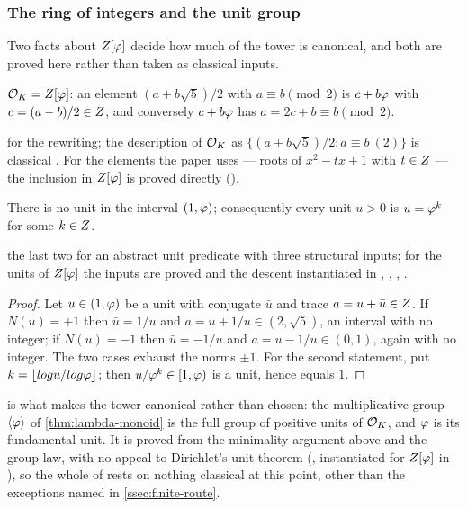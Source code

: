 \subsubsection{The ring of integers and the unit group}\label{ssec:units}

Two facts about $Z[\varphi]$ decide how much of the tower is canonical, and both are proved here
rather than taken as classical inputs.

\begin{proposition}\label{prop:OK}
$\mathcal{O}_K=Z[\varphi]$: an element $(a+b\sqrt5)/2$ with $a\equiv b\pmod2$ is
$c+b\varphi$ with $c=(a-b)/2\in Z$, and conversely $c+b\varphi$ has
$a=2c+b\equiv b\pmod2$.
\end{proposition}
for the
rewriting; the description of $\mathcal{O}_K$ as $\{(a+b\sqrt5)/2 : a\equiv b\ (2)\}$ is classical
.  For the elements the paper uses --- roots of $x^2-tx+1$ with $t\in Z$ --- the
inclusion in $Z[\varphi]$ is proved directly ().

\begin{theorem}\label{thm:units}
There is no unit in the interval $(1,\varphi)$; consequently every unit $u>0$ is
$u=\varphi^{k}$ for some $k\in Z$.
\end{theorem}
the last two for an abstract unit
predicate with three structural inputs; for the units of $Z[\varphi]$ the inputs are
proved and the descent instantiated in ,
, , .
\begin{proof}
Let $u\in(1,\varphi)$ be a unit with conjugate $\bar u$ and trace
$a=u+\bar u\in Z$.  If $N(u)=+1$ then $\bar u=1/u$ and
$a=u+1/u\in(2,\sqrt5)$, an interval with no integer; if $N(u)=-1$ then
$\bar u=-1/u$ and $a=u-1/u\in(0,1)$, again with no integer.  The two cases exhaust the norms $\pm1$.  For the
second statement, put $k=\lfloor log u/log\varphi\rfloor$; then
$u/\varphi^{k}\in[1,\varphi)$ is a unit, hence equals $1$.
\end{proof}

 is what makes the tower canonical rather than chosen: the
multiplicative group $\langle\varphi\rangle$ of \cref{thm:lambda-monoid} is the
full group of positive units of $\mathcal{O}_K$, and $\varphi$ is its fundamental unit.  It
is proved from the minimality argument above and the group law, with no appeal to
Dirichlet's unit theorem (, instantiated
for $Z[\varphi]$ in ), so the whole of 
rests on nothing classical at this point, other than
the exceptions named in \cref{ssec:finite-route}.

